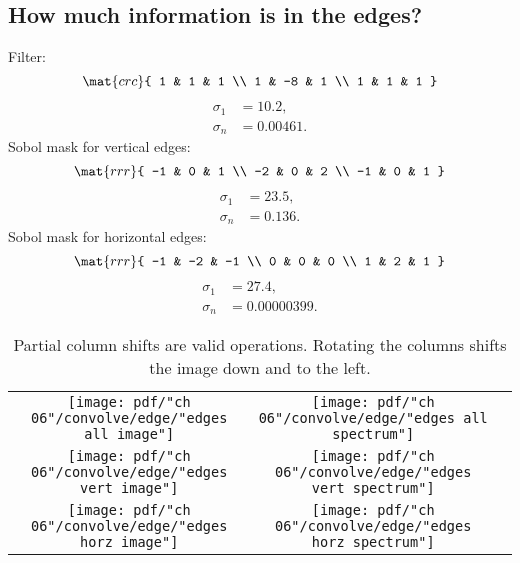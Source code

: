 \subsection{How much information is in the edges?}
Filter:
\begin{equation}
  \mat{crc}{
  1 &  1 & 1 \\
  1 & -8 & 1 \\
  1 &  1 & 1 }
\end{equation}
\begin{equation}
  \begin{split}
     \sigma_{1} &= 10.2,\\
     \sigma_{n} &= 0.00461.
  \end{split}
\end{equation}
Sobol mask for vertical edges:
\begin{equation}
  \mat{rrr}{
  -1 & 0 & 1 \\
  -2 & 0 & 2 \\
  -1 & 0 & 1 }
\end{equation}
\begin{equation}
  \begin{split}
     \sigma_{1} &= 23.5,\\
     \sigma_{n} &= 0.136.
  \end{split}
\end{equation}
Sobol mask for horizontal edges:
\begin{equation}
  \mat{rrr}{
  -1 & -2 & -1 \\
   0 &  0 &  0 \\
   1 &  2 &  1 }
\end{equation}
\begin{equation}
  \begin{split}
     \sigma_{1} &= 27.4,\\
     \sigma_{n} &= 0.00000399.
  \end{split}
\end{equation}
\begin{table}[htdp]
\begin{center}
\begin{tabular}{ccc}
\texttt{[image: pdf/"ch 06"/convolve/edge/"edges all image"]} &
\texttt{[image: pdf/"ch 06"/convolve/edge/"edges all spectrum"]} \\
\texttt{[image: pdf/"ch 06"/convolve/edge/"edges vert image"]} &
\texttt{[image: pdf/"ch 06"/convolve/edge/"edges vert spectrum"]} \\
\texttt{[image: pdf/"ch 06"/convolve/edge/"edges horz image"]} &
\texttt{[image: pdf/"ch 06"/convolve/edge/"edges horz spectrum"]} \\
\end{tabular}
\end{center}
\label{tab:Jordan:edge}
\caption[Singular values and edges]{Partial column shifts are valid operations. Rotating the columns shifts the image down and to the left.}
\end{table}%


\endinput